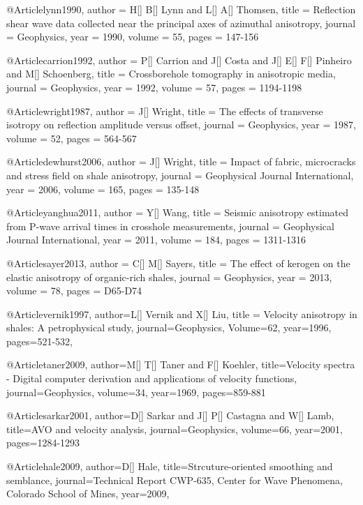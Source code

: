 @Article{lynn1990,
  author = 	 {H[] B[] Lynn and L[] A[] Thomsen},
  title = 	 {Reflection shear wave data collected near the principal axes of azimuthal anisotropy},
  journal = 	 {Geophysics},
  year = 	 1990,
  volume =	 55,
  pages =	 {147-156}
}

@Article{carrion1992,
  author = 	 {P[] Carrion and J[] Costa and J[] E[] F[] Pinheiro and M[] Schoenberg},
  title = 	 {Crossborehole tomography in anisotropic media},
  journal = 	 {Geophysics},
  year = 	 1992,
  volume =	 57,
  pages =	 {1194-1198}
}

@Article{wright1987,
  author = 	 {J[] Wright},
  title = 	 {The effects of transverse isotropy on reflection amplitude versus offset},
  journal = 	 {Geophysics},
  year = 	 1987,
  volume =	 52,
  pages =	 {564-567}
}

@Article{dewhurst2006,
  author = 	 {J[] Wright},
  title = 	 {Impact of fabric, microcracks and stress field on shale anisotropy},
  journal = 	 {Geophysical Journal International},
  year = 	 2006,
  volume =	 165,
  pages =	 {135-148}
}

@Article{yanghua2011,
  author = 	 {Y[] Wang},
  title = 	 {Seismic anisotropy estimated from P-wave arrival times in crosshole measurements},
  journal = 	 {Geophysical Journal International},
  year = 	 2011,
  volume =	 184,
  pages =	 {1311-1316}
}

@Article{sayer2013,
  author = 	 {C[] M[] Sayers},
  title = 	 {The effect of kerogen on the elastic anisotropy of
organic-rich shales},
  journal = 	 {Geophysics},
  year = 	 2013,
  volume =	 78,
  pages =	 {D65-D74}
}

@Article{vernik1997,
  author={L[] Vernik and X[] Liu},
  title = {Velocity anisotropy in shales: A petrophysical study},
  journal={Geophysics},
  Volume=62,
  year=1996,
  pages={521-532},
}


@Article{taner2009,
author={M[] T[] Taner and F[] Koehler},
title={Velocity spectra - Digital computer derivation and applications of velocity functions},
journal={Geophysics},
volume=34,
year=1969,
pages={859-881}
}

@Article{sarkar2001,
author={D[] Sarkar and J[] P[] Castagna and W[] Lamb},
title={AVO and velocity analysis},
journal={Geophysics},
volume=66,
year=2001,
pages={1284-1293}
}

@Article{hale2009,
author={D[] Hale},
title={Strcuture-oriented smoothing and semblance},
journal={Technical Report CWP-635, Center for Wave Phenomena, Colorado School of Mines},
year=2009,
}


